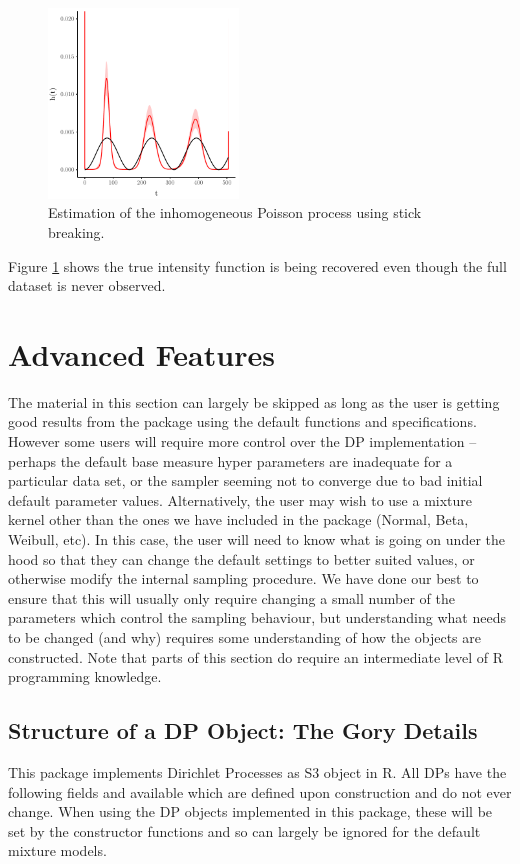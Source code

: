 \documentclass[nojss]{jss}
\begin{document}
\begin{figure}[tb]
\centering
\includegraphics[width=0.45\textwidth]{img/poissonStickBreaking.pdf}
\caption{Estimation of the inhomogeneous Poisson process using stick breaking.}
\label{fig:poissonStick}
\end{figure}
Figure \ref{fig:poissonStick} shows the true intensity function is being recovered even though the full dataset is never observed.



\section{Advanced Features}
The material in this section can largely be skipped as long as the user is getting good results from the  package using the default functions and specifications. However some users will require more control over the DP implementation -- perhaps the default base measure hyper parameters are inadequate for a particular data set, or the sampler seeming not to converge due to bad initial default parameter values. Alternatively, the user may wish to use a mixture kernel other than the ones we have included in the package (Normal, Beta, Weibull, etc). In this case, the user will need to know  what is going on under the hood so that they can change the default settings to better suited values, or otherwise modify the internal sampling procedure. We have done our best to ensure that this will usually only require changing a small number of the parameters which control the sampling behaviour, but understanding what needs to be changed (and why) requires some understanding of how the objects are constructed. Note that parts of this section do require an intermediate level of R programming knowledge.

\subsection{Structure of a DP Object: The Gory Details}
This package implements Dirichlet Processes as S3 object in R. All DPs have the following fields and available which are defined upon construction and do not ever change. When using the DP objects implemented in this package, these will be set by the constructor functions and so can largely be ignored for the default mixture models.
\end{document}
